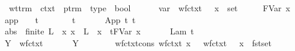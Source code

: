 \begin{isabellebody}
\ wt{\isacharunderscore}trm\ {\isacharcolon}{\isacharcolon}\ {\isachardoublequoteopen}ctxt\ {\isasymRightarrow}\ ptrm\ {\isasymRightarrow}\ type\ {\isasymRightarrow}\ bool{\isachardoublequoteclose}\ {\isacharparenleft}{\isachardoublequoteopen}{\isacharunderscore}\ {\isasymturnstile}\ {\isacharunderscore}\ {\isacharcolon}\ {\isacharunderscore}{\isachardoublequoteclose}{\isacharparenright}\ \isanewline
var{\isacharcolon}\ {\isachardoublequoteopen}{\isasymlbrakk}\ wf{\isacharunderscore}ctxt\ {\isasymGamma}\ {\isacharsemicolon}\ {\isacharparenleft}x{\isacharcomma}{\isasymsigma}{\isacharparenright}\ {\isasymin}\ set\ {\isasymGamma}\ {\isasymrbrakk}\ {\isasymLongrightarrow}\ {\isasymGamma}\ {\isasymturnstile}\ FVar\ x\ {\isacharcolon}\ {\isasymsigma}{\isachardoublequoteclose}\ {\isacharbar}\isanewline
app{\isacharcolon}\ {\isachardoublequoteopen}{\isasymlbrakk}\ {\isasymGamma}\ {\isasymturnstile}\ t{}\ {\isacharcolon}\ {\isasymtau}\ {\isasymrightarrow}\ {\isasymsigma}\ {\isacharsemicolon}\ {\isasymGamma}\ {\isasymturnstile}\ t{}\ {\isacharcolon}\ {\isasymtau}\ {\isasymrbrakk}\ {\isasymLongrightarrow}\ {\isasymGamma}\ {\isasymturnstile}\ App\ t{}\ t{}\ {\isacharcolon}\ {\isasymsigma}{\isachardoublequoteclose}\ {\isacharbar}\isanewline
abs{\isacharcolon}\ {\isachardoublequoteopen}{\isasymlbrakk}\ finite\ L\ {\isacharsemicolon}\ {\isacharparenleft}{\isasymAnd}x{\isachardot}\ x\ {\isasymnotin}\ L\ {\isasymLongrightarrow}\ {\isacharparenleft}{\isacharparenleft}x{\isacharcomma}{\isasymsigma}{\isacharparenright}{\isacharhash}{\isasymGamma}{\isacharparenright}\ {\isasymturnstile}\ {\isacharparenleft}t{\isacharcircum}{\isacharparenleft}FVar\ x{\isacharparenright}{\isacharparenright}\ {\isacharcolon}\ {\isasymtau}{\isacharparenright}\ {\isasymrbrakk}\ {\isasymLongrightarrow}\ {\isasymGamma}\ {\isasymturnstile}\ Lam\ t\ {\isacharcolon}\ {\isasymsigma}\ {\isasymrightarrow}\ {\isasymtau}{\isachardoublequoteclose}\ {\isacharbar}\isanewline
Y{\isacharcolon}\ {\isachardoublequoteopen}{\isasymlbrakk}\ wf{\isacharunderscore}ctxt\ {\isasymGamma}\ {\isasymrbrakk}\ {\isasymLongrightarrow}\ \ {\isasymGamma}\ {\isasymturnstile}\ Y\ {\isasymsigma}\ {\isacharcolon}\ {\isacharparenleft}{\isasymsigma}\ {\isasymrightarrow}\ {\isasymsigma}{\isacharparenright}\ {\isasymrightarrow}\ {\isasymsigma}{\isachardoublequoteclose}\isanewline
\isanewline
{}\isamarkupfalse%
\ wf{\isacharunderscore}ctxt{\isacharunderscore}cons{\isacharcolon}\ {\isachardoublequoteopen}wf{\isacharunderscore}ctxt\ {\isacharparenleft}{\isacharparenleft}x{\isacharcomma}\ {\isasymsigma}{\isacharparenright}{\isacharhash}{\isasymGamma}{\isacharparenright}\ {\isasymLongrightarrow}\ wf{\isacharunderscore}ctxt\ {\isasymGamma}\ {\isasymand}\ x\ {\isasymnotin}\ fst{\isacharbackquote}set\ {\isasymGamma}{\isachardoublequoteclose}\isanewline

\end{isabellebody}
